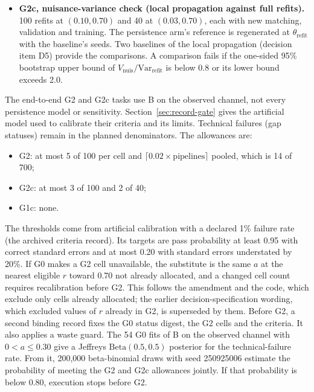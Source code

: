 \begin{itemize}
\item \textbf{G2c, nuisance-variance check (local propagation against full refits).} 100 refits at $(0.10,0.70)$ and 40 at $(0.03,0.70)$, each with new matching, validation and training. The persistence arm's reference is regenerated at $\theta_{\mathrm{refit}}$ with the baseline's seeds. Two baselines of the local propagation (decision item D5) provide the comparisons. A comparison fails if the one-sided 95\% bootstrap upper bound of $V_{\mathrm{nuis}}/\mathrm{Var}_{\mathrm{refit}}$ is below 0.8 or its lower bound exceeds 2.0.
\end{itemize}
The end-to-end G2 and G2c tasks use B on the observed channel, not every persistence model or sensitivity. Section~\ref{sec:record-gate} gives the artificial model used to calibrate their criteria and its limits. %
Technical failures (gap statuses) remain in the planned denominators. The allowances are:
\begin{itemize}
\item G2: at most 5 of 100 per cell and $\lceil0.02\times\text{pipelines}\rceil$ pooled, which is 14 of 700;
\item G2c: at most 3 of 100 and 2 of 40;
\item G1c: none.
\end{itemize}
The thresholds come from artificial calibration with a declared 1\% failure rate (the archived criteria record). Its targets are pass probability at least 0.95 with correct standard errors and at most 0.20 with standard errors understated by 20\%. If G0 makes a G2 cell unavailable, the substitute is the same $a$ at the nearest eligible $r$ toward 0.70 not already allocated, and a changed cell count requires recalibration before G2. This follows the amendment and the code, which exclude only cells already allocated; the earlier decision-specification wording, which excluded values of $r$ already in G2, is superseded by them. Before G2, a second binding record fixes the G0 status digest, the G2 cells and the criteria. It also applies a waste guard. The 54 G0 fits of B on the observed channel with $0<a\le0.30$ give a Jeffreys $\mathrm{Beta}(0.5,0.5)$ posterior for the technical-failure rate. From it, 200,000 beta-binomial draws with seed 250925006 estimate the probability of meeting the G2 and G2c allowances jointly. If that probability is below 0.80, execution stops before G2.

